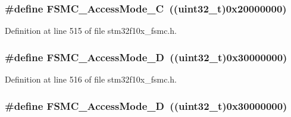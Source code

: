 \subsubsection[{\texorpdfstring{F\+S\+M\+C\+\_\+\+Access\+Mode\+\_\+C}{FSMC_AccessMode_C}}]{\setlength{\rightskip}{0pt plus 5cm}\#define F\+S\+M\+C\+\_\+\+Access\+Mode\+\_\+C~(({\bf uint32\+\_\+t})0x20000000)}\hypertarget{group___f_s_m_c___access___mode_ga83ffa035cf2e95c957b67a2e8b879e86}{}\label{group___f_s_m_c___access___mode_ga83ffa035cf2e95c957b67a2e8b879e86}


Definition at line 515 of file stm32f10x\+\_\+fsmc.\+h.

\subsubsection[{\texorpdfstring{F\+S\+M\+C\+\_\+\+Access\+Mode\+\_\+D}{FSMC_AccessMode_D}}]{\setlength{\rightskip}{0pt plus 5cm}\#define F\+S\+M\+C\+\_\+\+Access\+Mode\+\_\+D~(({\bf uint32\+\_\+t})0x30000000)}\hypertarget{group___f_s_m_c___access___mode_ga7c632e7ebeb0c0ab4919bb60b8714c7b}{}\label{group___f_s_m_c___access___mode_ga7c632e7ebeb0c0ab4919bb60b8714c7b}


Definition at line 516 of file stm32f10x\+\_\+fsmc.\+h.

\subsubsection[{\texorpdfstring{F\+S\+M\+C\+\_\+\+Access\+Mode\+\_\+D}{FSMC_AccessMode_D}}]{\setlength{\rightskip}{0pt plus 5cm}\#define F\+S\+M\+C\+\_\+\+Access\+Mode\+\_\+D~(({\bf uint32\+\_\+t})0x30000000)}\hypertarget{group___f_s_m_c___access___mode_ga7c632e7ebeb0c0ab4919bb60b8714c7b}{}\label{group___f_s_m_c___access___mode_ga7c632e7ebeb0c0ab4919bb60b8714c7b}


